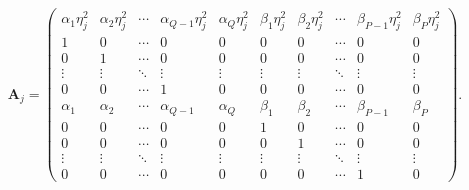\documentclass{rQUF2e}
\theoremstyle{plain}
\theoremstyle{definition}
\theoremstyle{remark}
\begin{document}
\[
    \mathbf{A}_j =
    \begin{pmatrix}
        \alpha_1 \eta_j^2 & \alpha_2 \eta_j^2 & \cdots & \alpha_{Q - 1} \eta_j^2 & \alpha_Q \eta_j^2 & \beta_1 \eta_j^2 & \beta_2 \eta_j^2 & \cdots & \beta_{P - 1} \eta_j^2 & \beta_P \eta_j^2 \\
        1                 & 0                 & \cdots & 0                       & 0                 & 0                & 0                & \cdots & 0                      & 0                \\
        0                 & 1                 & \cdots & 0                       & 0                 & 0                & 0                & \cdots & 0                      & 0                \\
        \vdots            & \vdots            & \ddots & \vdots                  & \vdots            & \vdots           & \vdots           & \ddots & \vdots                 & \vdots           \\
        0                 & 0                 & \cdots & 1                       & 0                 & 0                & 0                & \cdots & 0                      & 0                \\
        \alpha_1          & \alpha_2          & \cdots & \alpha_{Q - 1}          & \alpha_Q          & \beta_1          & \beta_2          & \cdots & \beta_{P - 1}          & \beta_P          \\
        0                 & 0                 & \cdots & 0                       & 0                 & 1                & 0                & \cdots & 0                      & 0                \\
        0                 & 0                 & \cdots & 0                       & 0                 & 0                & 1                & \cdots & 0                      & 0                \\
        \vdots            & \vdots            & \ddots & \vdots                  & \vdots            & \vdots           & \vdots           & \ddots & \vdots                 & \vdots           \\
        0                 & 0                 & \cdots & 0                       & 0                 & 0                & 0                & \cdots & 1                      & 0
    \end{pmatrix}.
\]
\end{document}
